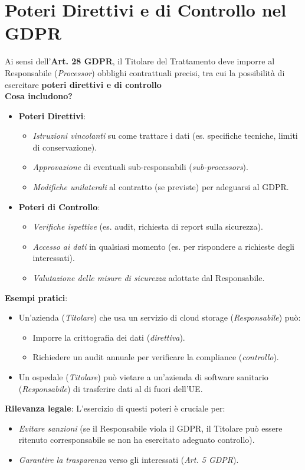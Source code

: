 \documentclass[8pt,oneside,a4paper]{article}
\begin{document}
	\section{Poteri Direttivi e di Controllo nel GDPR}
	Ai sensi dell’\textbf{Art. 28 GDPR}, il Titolare del Trattamento deve imporre al Responsabile (\textit{Processor}) obblighi contrattuali precisi, tra cui la possibilità di esercitare \textbf{poteri direttivi e di controllo}\\  
	\noindent \textbf{Cosa includono?}  
	\begin{itemize}
		\item \textbf{Poteri Direttivi}:  
		\begin{itemize}
			\item \textit{Istruzioni vincolanti} su come trattare i dati (es. specifiche tecniche, limiti di conservazione).  
			\item \textit{Approvazione} di eventuali sub-responsabili (\textit{sub-processors}).  
			\item \textit{Modifiche unilaterali} al contratto (se previste) per adeguarsi al GDPR.  
		\end{itemize}  
		\item \textbf{Poteri di Controllo}:  
		\begin{itemize}
			\item \textit{Verifiche ispettive} (es. audit, richiesta di report sulla sicurezza).  
			\item \textit{Accesso ai dati} in qualsiasi momento (es. per rispondere a richieste degli interessati).  
			\item \textit{Valutazione delle misure di sicurezza} adottate dal Responsabile.  
		\end{itemize}  
	\end{itemize}  
	\noindent \textbf{Esempi pratici}:  
	\begin{itemize}
		\item Un’azienda (\textit{Titolare}) che usa un servizio di cloud storage (\textit{Responsabile}) può:  
		\begin{itemize}
			\item Imporre la crittografia dei dati (\textit{direttiva}).  
			\item Richiedere un audit annuale per verificare la compliance (\textit{controllo}).  
		\end{itemize}  
		\item Un ospedale (\textit{Titolare}) può vietare a un’azienda di software sanitario (\textit{Responsabile}) di trasferire dati al di fuori dell’UE.  
	\end{itemize}  
	\noindent \textbf{Rilevanza legale}:  
	L’esercizio di questi poteri è cruciale per:  
	\begin{itemize}
		\item \textit{Evitare sanzioni} (se il Responsabile viola il GDPR, il Titolare può essere ritenuto corresponsabile se non ha esercitato adeguato controllo).  
		\item \textit{Garantire la trasparenza} verso gli interessati (\textit{Art. 5 GDPR}).  
	\end{itemize}  
\end{document}
